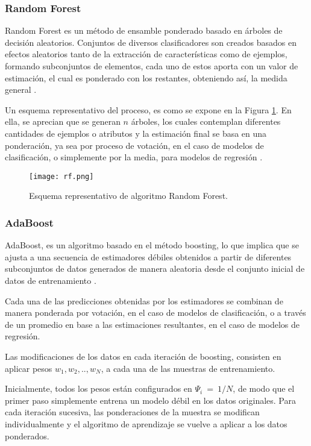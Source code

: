 \subsubsection{Random Forest}

Random Forest es un método de ensamble ponderado basado en árboles de decisión aleatorios. Conjuntos de diversos clasificadores son creados basados en efectos aleatorios tanto de la extracción de características como de ejemplos, formando subconjuntos de elementos, cada uno de estos aporta con un valor de estimación, el cual es ponderado con los restantes, obteniendo así, la medida general \cite{breiman1998}.

Un esquema representativo del proceso, es como se expone en la Figura \ref{rf1}. En ella, se aprecian que se generan $n$ árboles, los cuales contemplan diferentes cantidades de ejemplos o atributos y la estimación final se basa en una ponderación, ya sea por proceso de votación, en el caso de modelos de clasificación, o simplemente por la media, para modelos de regresión \cite{Breiman2001}.

\begin{figure}[!h]
	\centering
	\texttt{[image: rf.png]}
	\caption{Esquema representativo de algoritmo Random Forest.}
	\label{rf1}
	
\end{figure}

\subsubsection{AdaBoost}

AdaBoost, es un algoritmo basado en el método boosting, lo que implica que se ajusta a una secuencia de estimadores débiles obtenidos a partir de diferentes subconjuntos de datos generados de manera aleatoria desde el conjunto inicial de datos de entrenamiento \cite{CAO2013745}. 

Cada una de las predicciones obtenidas por los estimadores se combinan de manera ponderada por votación, en el caso de modelos de clasificación, o a través de un promedio en base a las estimaciones resultantes, en el caso de modelos de regresión.

Las modificaciones de los datos en cada iteración de boosting, consisten en aplicar pesos $w_{1},w_{2},..,w_{N}$, a cada una de las muestras de entrenamiento. 

Inicialmente, todos los pesos están configurados en $\Psi_{i}\ =\ 1/N$, de modo que el primer paso simplemente entrena un modelo débil en los datos originales. Para cada iteración sucesiva, las ponderaciones de la muestra se modifican individualmente y el algoritmo de aprendizaje se vuelve a aplicar a los datos ponderados. 

